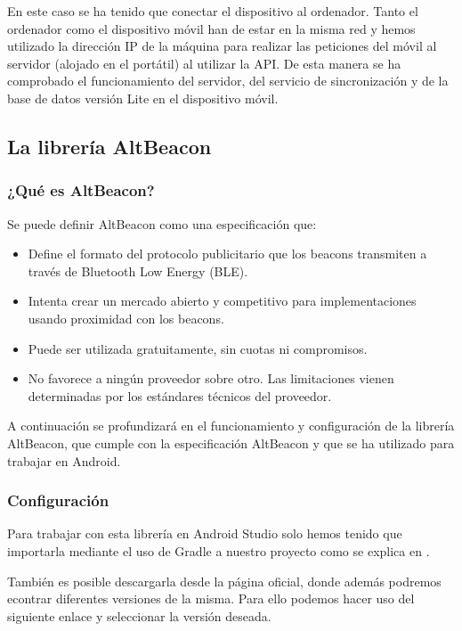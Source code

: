En este caso se ha tenido que conectar el dispositivo al ordenador. Tanto el ordenador como el dispositivo móvil han de estar en la misma red y hemos utilizado la dirección IP de la máquina para realizar las peticiones del móvil al servidor (alojado en el portátil) al utilizar la API. De esta manera se ha comprobado el funcionamiento del servidor, del servicio de sincronización y de la base de datos versión Lite en el dispositivo móvil.


\subsection{La librería AltBeacon}


\subsubsection{¿Qué es AltBeacon?}

Se puede definir AltBeacon como una especificación que: 

\begin{itemize}
\item Define el formato del protocolo publicitario que los beacons transmiten a través de Bluetooth Low Energy (BLE).
\item Intenta crear un mercado abierto y competitivo para implementaciones usando proximidad con los beacons.
\item Puede ser utilizada gratuitamente, sin cuotas ni compromisos.
\item No favorece a ningún proveedor sobre otro. Las limitaciones vienen determinadas por los estándares técnicos del proveedor.
\end{itemize}

A continuación se profundizará en el funcionamiento y configuración de la librería AltBeacon, que cumple con la especificación AltBeacon y que se ha utilizado para trabajar en Android.

\subsubsection{Configuración}

Para trabajar con esta librería en Android Studio solo hemos tenido que importarla mediante el uso de Gradle a nuestro proyecto como se explica en \cite{URL::importGradle}.


También es posible descargarla desde la página oficial, donde además podremos econtrar diferentes versiones de la misma. Para ello podemos hacer uso del siguiente enlace \cite{URL::versionAltBeacon} y seleccionar la versión deseada.



